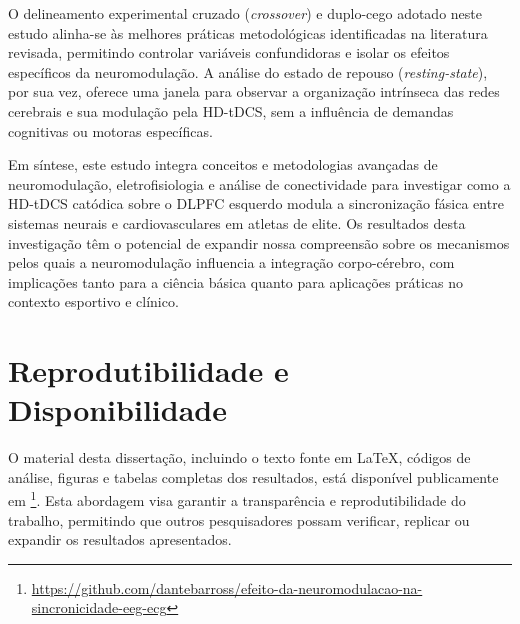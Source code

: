 O delineamento experimental cruzado (\textit{crossover}) e duplo-cego adotado neste estudo alinha-se às melhores práticas metodológicas identificadas na literatura revisada, permitindo controlar variáveis confundidoras e isolar os efeitos específicos da neuromodulação. A análise do estado de repouso (\textit{resting-state}), por sua vez, oferece uma janela para observar a organização intrínseca das redes cerebrais e sua modulação pela HD-tDCS, sem a influência de demandas cognitivas ou motoras específicas.

Em síntese, este estudo integra conceitos e metodologias avançadas de neuromodulação, eletrofisiologia e análise de conectividade para investigar como a HD-tDCS catódica sobre o DLPFC esquerdo modula a sincronização fásica entre sistemas neurais e cardiovasculares em atletas de elite. Os resultados desta investigação têm o potencial de expandir nossa compreensão sobre os mecanismos pelos quais a neuromodulação influencia a integração corpo-cérebro, com implicações tanto para a ciência básica quanto para aplicações práticas no contexto esportivo e clínico.

\section{Reprodutibilidade e Disponibilidade}
O material desta dissertação, incluindo o texto fonte em \LaTeX, códigos de análise, figuras e tabelas completas dos resultados, está disponível publicamente em \footnote{\url{https://github.com/dantebarross/efeito-da-neuromodulacao-na-sincronicidade-eeg-ecg}}. Esta abordagem visa garantir a transparência e reprodutibilidade do trabalho, permitindo que outros pesquisadores possam verificar, replicar ou expandir os resultados apresentados.